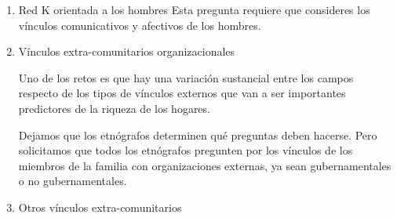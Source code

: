 \documentclass[a4paper,10pt]{article}
\theoremstyle{definition}
\begin{document}
\begin{enumerate}
 \item Red K orientada a los hombres
 Esta pregunta requiere que consideres los vínculos comunicativos y afectivos de los hombres. 
 
 
 \item Vínculos extra-comunitarios organizacionales 
 
 Uno de los retos es que hay una variación sustancial entre los campos respecto de los tipos de vínculos externos que van a ser importantes predictores de la riqueza de los hogares. 
 
 Dejamos que los etnógrafos determinen qué preguntas deben hacerse. Pero solicitamos que todos los etnógrafos pregunten por los vínculos de los miembros de la familia con organizaciones externas, ya sean gubernamentales o no gubernamentales. 
 
 \item Otros vínculos extra-comunitarios
\end{enumerate}
\end{document}

